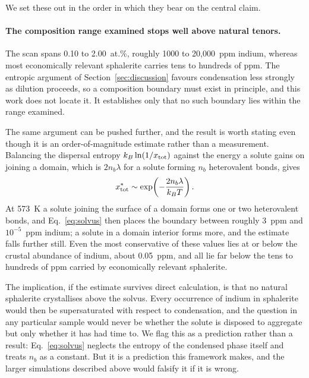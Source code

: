 \documentclass[11pt,a4paper]{article}
\begin{document}
We set these out in the order in which they bear on the central claim.

\paragraph{The composition range examined stops well above natural tenors.} The
scan spans 0.10 to 2.00~at.\%, roughly 1000 to 20{,}000~ppm indium, whereas most
economically relevant sphalerite carries tens to hundreds of ppm. The entropic
argument of Section~\ref{sec:discussion} favours condensation less strongly as
dilution proceeds, so a composition boundary must exist in principle, and this
work does not locate it. It establishes only that no such boundary lies within
the range examined.

The same argument can be pushed further, and the result is worth stating even
though it is an order-of-magnitude estimate rather than a measurement. Balancing
the dispersal entropy $k_B \ln(1/x_{\rm tot})$ against the energy a solute gains
on joining a domain, which is $2 n_b \lambda$ for a solute forming $n_b$
heterovalent bonds, gives
\begin{equation}
x_{\rm tot}^{\ast} \sim \exp\!\left(-\frac{2 n_b \lambda}{k_B T}\right).
\label{eq:solvus}
\end{equation}
At 573~K a solute joining the surface of a domain forms one or two heterovalent
bonds, and Eq.~\eqref{eq:solvus} then places the boundary between roughly
3~ppm and $10^{-5}$~ppm indium; a solute in a domain interior forms more, and the
estimate falls further still. Even the most conservative of these values lies at
or below the crustal abundance of indium, about 0.05~ppm, and all lie far below
the tens to hundreds of ppm carried by economically relevant sphalerite.

The implication, if the estimate survives direct calculation, is that no natural
sphalerite crystallises above the solvus. Every occurrence of indium in
sphalerite would then be supersaturated with respect to condensation, and the
question in any particular sample would never be whether the solute is disposed
to aggregate but only whether it has had time to. We flag this as a prediction
rather than a result: Eq.~\eqref{eq:solvus} neglects the entropy of the
condensed phase itself and treats $n_b$ as a constant. But it is a prediction
this framework makes, and the larger simulations described above would falsify
it if it is wrong.
\end{document}
